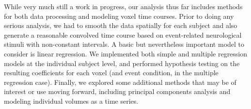 \par \indent While very much still a work in progress, our analysis thus far 
includes methods for both data processing and modeling voxel time courses. 
Prior to doing any serious analysis, we had to smooth the data spatially for 
each subject and also generate a reasonable convolved time course based on 
event-related neurological stimuli with non-constant intervals. A basic but 
nevertheless important model to consider is linear regression. We implemented 
both simple and multiple regression models at the individual subject level, and 
performed hypothesis testing on the resulting coefficients for each voxel (and 
event condition, in the multiple regression case). Finally, we explored some 
additional methods that may be of interest or use moving forward, including 
principal components analysis and modeling individual volumes as a time series. 
